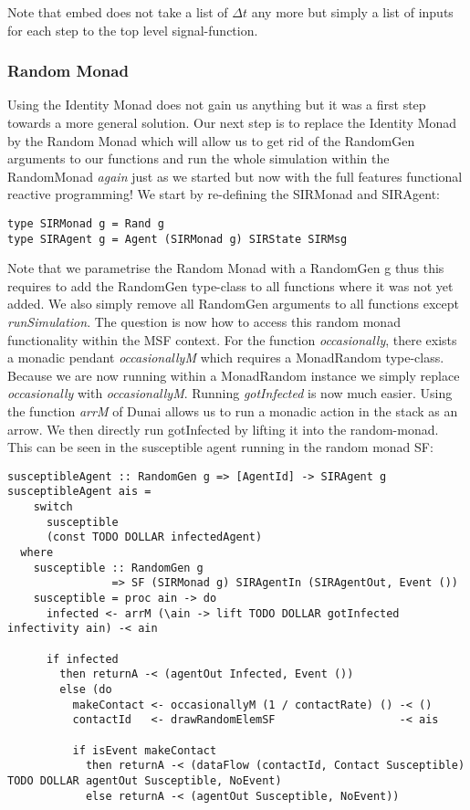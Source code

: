 Note that embed does not take a list of $\Delta t$ any more but simply a list of inputs for each step to the top level signal-function.

\subsubsection{Random Monad}
Using the Identity Monad does not gain us anything but it was a first step towards a more general solution. Our next step is to replace the Identity Monad by the Random Monad which will allow us to get rid of the RandomGen arguments to our functions and run the whole simulation within the RandomMonad \textit{again} just as we started but now with the full features functional reactive programming!
We start by re-defining the SIRMonad and SIRAgent:

\begin{verbatim}
type SIRMonad g = Rand g
type SIRAgent g = Agent (SIRMonad g) SIRState SIRMsg
\end{verbatim}

Note that we parametrise the Random Monad with a RandomGen g thus this requires to add the RandomGen type-class to all functions where it was not yet added. We also simply remove all RandomGen arguments to all functions except \textit{runSimulation}. The question is now how to access this random monad functionality within the MSF context.
For the function \textit{occasionally}, there exists a monadic pendant \textit{occasionallyM} which requires a MonadRandom type-class. Because we are now running within a MonadRandom instance we simply replace \textit{occasionally} with \textit{occasionallyM}.
Running \textit{gotInfected} is now much easier. Using the function \textit{arrM} of Dunai allows us to run a monadic action in the stack as an arrow. We then directly run gotInfected by lifting it into the random-monad.
This can be seen in the susceptible agent running in the random monad SF:
\begin{verbatim}
susceptibleAgent :: RandomGen g => [AgentId] -> SIRAgent g
susceptibleAgent ais = 
    switch 
      susceptible
      (const TODO DOLLAR infectedAgent)
  where
    susceptible :: RandomGen g 
                => SF (SIRMonad g) SIRAgentIn (SIRAgentOut, Event ())
    susceptible = proc ain -> do
      infected <- arrM (\ain -> lift TODO DOLLAR gotInfected infectivity ain) -< ain

      if infected 
        then returnA -< (agentOut Infected, Event ())
        else (do
          makeContact <- occasionallyM (1 / contactRate) () -< ()
          contactId   <- drawRandomElemSF                   -< ais

          if isEvent makeContact
            then returnA -< (dataFlow (contactId, Contact Susceptible) TODO DOLLAR agentOut Susceptible, NoEvent)
            else returnA -< (agentOut Susceptible, NoEvent))
\end{verbatim}

